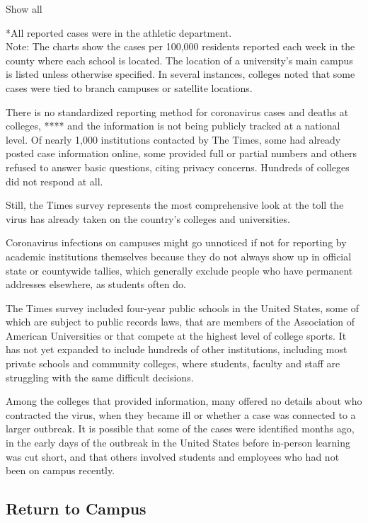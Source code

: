 Show all

*All reported cases were in the athletic department.\\
Note: The charts show the cases per 100,000 residents reported each week
in the county where each school is located. The location of a
university's main campus is listed unless otherwise specified. In
several instances, colleges noted that some cases were tied to branch
campuses or satellite locations.

There is no standardized reporting method for coronavirus cases and
deaths at colleges, **** and the information is not being publicly
tracked at a national level. Of nearly 1,000 institutions contacted by
The Times, some had already posted case information online, some
provided full or partial numbers and others refused to answer basic
questions, citing privacy concerns. Hundreds of colleges did not respond
at all.

Still, the Times survey represents the most comprehensive look at the
toll the virus has already taken on the country's colleges and
universities.

Coronavirus infections on campuses might go unnoticed if not for
reporting by academic institutions themselves because they do not always
show up in official state or countywide tallies, which generally exclude
people who have permanent addresses elsewhere, as students often do.

The Times survey included four-year public schools in the United States,
some of which are subject to public records laws, that are members of
the Association of American Universities or that compete at the highest
level of college sports. It has not yet expanded to include hundreds of
other institutions, including most private schools and community
colleges, where students, faculty and staff are struggling with the same
difficult decisions.

Among the colleges that provided information, many offered no details
about who contracted the virus, when they became ill or whether a case
was connected to a larger outbreak. It is possible that some of the
cases were identified months ago, in the early days of the outbreak in
the United States before in-person learning was cut short, and that
others involved students and employees who had not been on campus
recently.

\hypertarget{return-to-campus}{%
\subsection{Return to Campus}\label{return-to-campus}}

